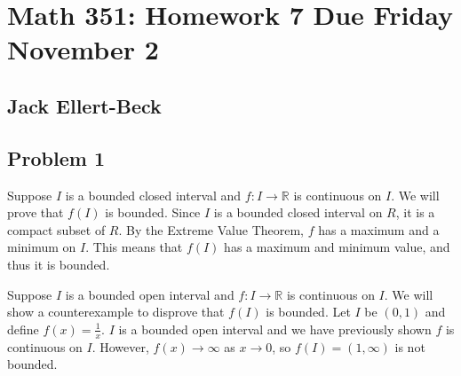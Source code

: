 \documentclass[11pt]{article}
\newcommand{\R}{\mathbb{R}}
\begin{document}
\setlength{\parindent}{0pt}
\setlength{\parskip}{9pt}


\section*{Math 351: Homework 7  Due Friday November 2}
\subsection*{Jack Ellert-Beck}

\bigskip

\subsection*{Problem 1}

Suppose $I$ is a bounded closed interval and $f:I\to\R$ is continuous on
$I$. We will prove that $f(I)$ is bounded. Since $I$ is a bounded closed
interval on $R$, it is a compact subset of $R$. By the Extreme Value
Theorem, $f$ has a maximum and a minimum on $I$. This means that 
$f(I)$ has a maximum and minimum value, and thus it is bounded.

Suppose $I$ is a bounded open interval and $f:I\to\R$ is continuous on $I$.
We will show a counterexample to disprove that $f(I)$ is bounded.
Let $I$ be $(0,1)$ and define $f(x) = \frac{1}{x}$. $I$ is a bounded open
interval and we have previously shown $f$ is continuous on $I$. However,
$f(x)\to\infty$ as $x\to0$, so $f(I) = (1,\infty)$ is not bounded.
\end{document}
